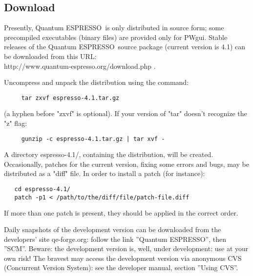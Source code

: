 \documentclass[12pt,a4paper]{article}
\def\version{4.1}
\def\qe{{\sc Quantum ESPRESSO}}
\begin{document}
\subsection{Download}
 
Presently, \qe\ is only distributed in source form; 
some precompiled executables (binary files) are provided only for PWgui. 
Stable releases of the \qe\ source package (current version 
is \version) can be downloaded from this URL: \\
http://www.quantum-espresso.org/download.php .

Uncompress and unpack the distribution using the command:
\begin{verbatim}
     tar zxvf espresso-4.1.tar.gz
\end{verbatim}
(a hyphen before "zxvf" is optional). If your version of "tar" 
doesn't recognize the "z" flag:
\begin{verbatim}
     gunzip -c espresso-4.1.tar.gz | tar xvf -
\end{verbatim}
A directory espresso-\version/, containing the distribution, will be created. 
Occasionally, patches for the current version, fixing some errors and bugs,
may be distributed as a "diff" file. In order to install a patch (for instance):\begin{verbatim}
   cd espresso-4.1/
   patch -p1 < /path/to/the/diff/file/patch-file.diff
\end{verbatim}

If more than one patch is present, they should be applied in the correct order.

Daily snapshots of the development version can be downloaded from the
developers' site qe-forge.org: follow the link ''Quantum ESPRESSO'',
then ''SCM''. Beware: the development version is, well, under
development: use at your own risk! The bravest may access the 
development version via anonymous CVS 
(Concurrent Version System): see the developer manual, section
''Using CVS''.
\end{document}
